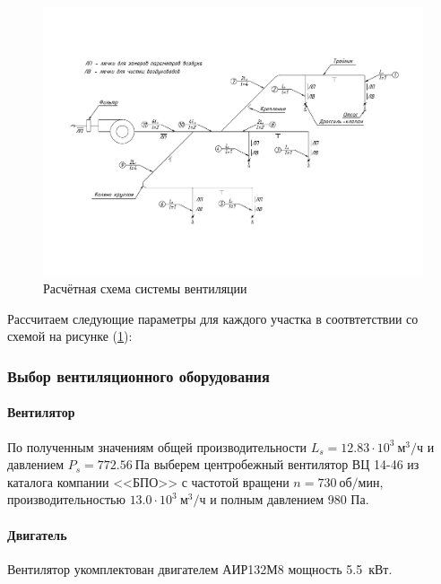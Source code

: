 \begin{figure}[ht]
    \centering
    \includegraphics[width=\textwidth, keepaspectratio, clip=true, trim=0mm 35mm 0mm 40mm]
                    {./src/ecology/pictures/vent_system_arrangement}
    \caption{Расчётная схема системы вентиляции}
    \label{pic_vent_system_arrangement}
\end{figure}

Рассчитаем следующие параметры для каждого участка в соотвтетствии со схемой на
рисунке (\ref{pic_vent_system_arrangement}):



\subsubsection{Выбор вентиляционного оборудования}

\paragraph{Вентилятор}
По полученным значениям общей производительности $L_s = 12.83 \cdot 10^3 ~\text{м}^3 / \text{ч}$
и давлением $P_s = 772.56 ~\text{Па}$ выберем центробежный
вентилятор ВЦ 14-46 из каталога компании <<БПО>> с частотой вращени
$n = 730 ~\text{об/мин}$, производительностью $13.0 \cdot 10^3 ~\text{м}^3 / \text{ч}$
и полным давлением 980 Па.

\paragraph{Двигатель}
Вентилятор укомплектован двигателем АИР132М8 мощность 5.5~кВт.

